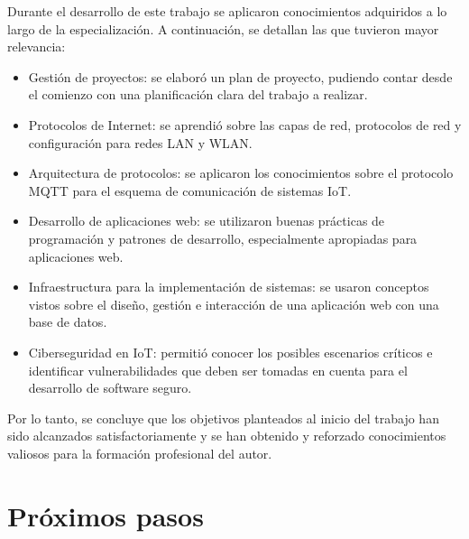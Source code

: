 
Durante el desarrollo de este trabajo se aplicaron conocimientos adquiridos a lo largo de la especialización. A continuación, se detallan las que tuvieron mayor relevancia:


\begin{itemize}
\item Gestión de proyectos: se elaboró un plan de proyecto, pudiendo contar desde el comienzo con una planificación clara del trabajo a realizar.

\item Protocolos de Internet: se aprendió sobre las capas de red, protocolos de red y configuración para redes LAN y WLAN. 

\item Arquitectura de protocolos: se aplicaron los conocimientos sobre el protocolo MQTT para el esquema de comunicación de sistemas IoT.

\item Desarrollo de aplicaciones web: se utilizaron buenas prácticas de programación y patrones de desarrollo, especialmente apropiadas para aplicaciones web. 

\item Infraestructura para la implementación de sistemas: se usaron conceptos vistos sobre el diseño, gestión e interacción de una aplicación web con una base de datos.

\item Ciberseguridad en IoT: permitió conocer los posibles escenarios críticos e identificar vulnerabilidades que deben ser tomadas en cuenta para el desarrollo de software seguro.

\end{itemize}

Por lo tanto, se concluye que los objetivos planteados al inicio del trabajo han sido alcanzados satisfactoriamente y se han obtenido y reforzado conocimientos valiosos para la formación profesional del autor.


\section{Próximos pasos}

